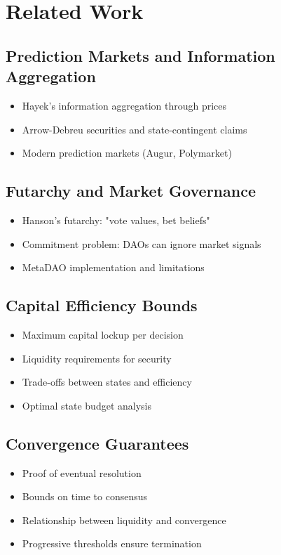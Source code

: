 \documentclass{article}
\begin{document}
\section{Related Work}
\subsection{Prediction Markets and Information Aggregation}
\begin{itemize}
   \item Hayek's information aggregation through prices
   \item Arrow-Debreu securities and state-contingent claims
   \item Modern prediction markets (Augur, Polymarket)
\end{itemize}

\subsection{Futarchy and Market Governance}
\begin{itemize}
   \item Hanson's futarchy: "vote values, bet beliefs"
   \item Commitment problem: DAOs can ignore market signals
   \item MetaDAO implementation and limitations
\end{itemize}

\subsection{Capital Efficiency Bounds}
\begin{itemize}
    \item Maximum capital lockup per decision
    \item Liquidity requirements for security
    \item Trade-offs between states and efficiency
    \item Optimal state budget analysis
\end{itemize}

\subsection{Convergence Guarantees}
\begin{itemize}
    \item Proof of eventual resolution
    \item Bounds on time to consensus
    \item Relationship between liquidity and convergence
    \item Progressive thresholds ensure termination
\end{itemize}
\end{document}
